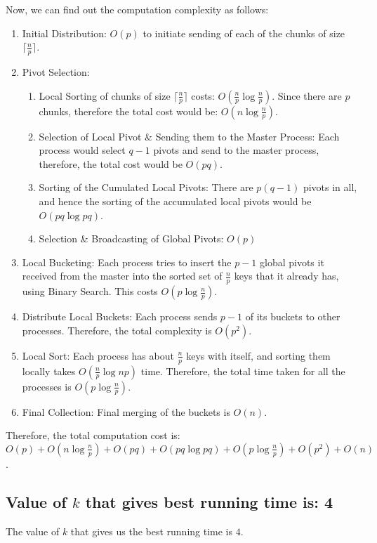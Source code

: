 \documentclass{article}
\begin{document}
Now, we can find out the computation complexity as follows:
\begin{enumerate}
\item Initial Distribution: $O(p)$ to initiate sending of each
of the chunks of size $\lceil\frac{n}{p}\rceil$.
\item Pivot Selection: 
  \begin{enumerate}
  \item Local Sorting of chunks of size $\lceil\frac{n}{p}\rceil$ costs: $O(\frac{n}{p}\log{\frac{n}{p}})$. Since there are $p$ chunks, therefore the total cost would be: $O(n\log{\frac{n}{p}})$.
  \item Selection of Local Pivot \& Sending them to the Master Process: Each process would select $q-1$ pivots and send to the master process, therefore, the total cost would be $O(pq)$.
  \item Sorting of the Cumulated Local Pivots: There are $p(q-1)$ pivots in all, and hence the sorting of the accumulated local pivots would be $O(pq\log{pq})$.
  \item Selection \& Broadcasting of Global Pivots: $O(p)$
  \end{enumerate}
\item Local Bucketing: Each process tries to insert the $p-1$ 
global pivots it received from the master into the sorted set of 
$\frac{n}{p}$ keys that it already has, using Binary Search. 
This costs $O(p\log{\frac{n}{p}})$.
\item Distribute Local Buckets: Each process sends $p-1$ of its
buckets to other processes. Therefore, the total complexity is
$O(p^2)$.
\item Local Sort: Each process has about $\frac{n}{p}$ keys
with itself, and sorting them locally takes 
$O(\frac{n}{p}\log{n}{p})$ time. Therefore, the total time taken for all the processes is $O(p\log{\frac{n}{p}})$.
\item Final Collection: Final merging of the buckets is $O(n)$.
\end{enumerate}
Therefore, the total computation cost is: $O(p) + O(n\log{\frac{n}{p}}) + O(pq) + O(pq\log{pq}) + O(p\log{\frac{n}{p}}) + O(p^2) + O(n)$.

\subsection{Value of $k$ that gives best running time is: 4}

The value of $k$ that gives us the best running time is $4$.
\end{document}
